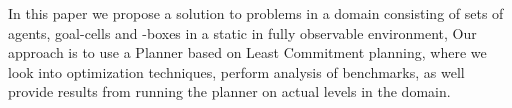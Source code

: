 \documentclass[Main]{subfiles}
\begin{document}

In this paper we propose a solution to problems in a domain consisting of sets of agents, goal-cells and -boxes in a static in fully observable environment,
Our approach is to use a Planner based on Least Commitment planning, where we look into optimization techniques, perform analysis of benchmarks, as well provide results from running the planner on actual levels in the domain.

\end{document}
